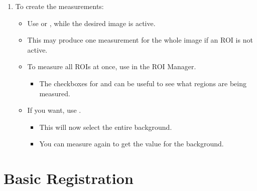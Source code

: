 \documentclass[letterpaper,10pt,english]{jupyterBook}
\begin{document}
\sphinxAtStartPar
{}
\begin{enumerate}
%
\setcounter{enumi}{1}
\item {} 
\sphinxAtStartPar
To create the measurements:
\begin{itemize}
\item {} 
\sphinxAtStartPar
Use  or , while the desired image is active.

\item {} 
\sphinxAtStartPar
This may produce one measurement for the whole image if an ROI is not active.

\item {} 
\sphinxAtStartPar
To measure all ROIs at once, use  in the ROI Manager.
\begin{itemize}
\item {} 
\sphinxAtStartPar
The checkboxes for  and  can be useful to see what regions are being measured.

\end{itemize}

\item {} 
\sphinxAtStartPar
If you want, use .
\begin{itemize}
\item {} 
\sphinxAtStartPar
This will now select the entire background.

\item {} 
\sphinxAtStartPar
You can measure again to get the value for the background.

\end{itemize}

\end{itemize}

\end{enumerate}

\sphinxstepscope


\chapter{Basic Registration}
\label{\detokenize{basic-registration:basic-registration}}\label{\detokenize{basic-registration::doc}}
\end{document}
